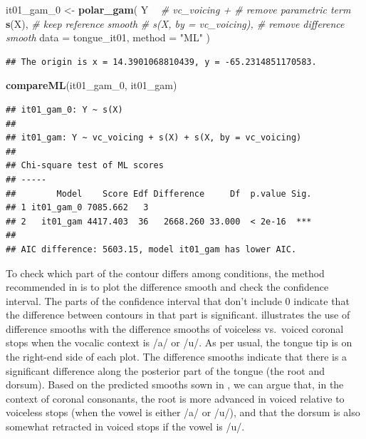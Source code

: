 \documentclass[11pt,]{article}
\newenvironment{Shaded}{\begin{snugshade}}{\end{snugshade}}
\newcommand{\CommentTok}[1]{\textcolor[rgb]{0.56,0.35,0.01}{\textit{#1}}}
\newcommand{\DataTypeTok}[1]{\textcolor[rgb]{0.13,0.29,0.53}{#1}}
\newcommand{\DecValTok}[1]{\textcolor[rgb]{0.00,0.00,0.81}{#1}}
\newcommand{\KeywordTok}[1]{\textcolor[rgb]{0.13,0.29,0.53}{\textbf{#1}}}
\newcommand{\NormalTok}[1]{#1}
\newcommand{\OperatorTok}[1]{\textcolor[rgb]{0.81,0.36,0.00}{\textbf{#1}}}
\newcommand{\StringTok}[1]{\textcolor[rgb]{0.31,0.60,0.02}{#1}}
\begin{document}
\begin{Shaded}
\begin{Highlighting}[]
\NormalTok{it01_gam_}\DecValTok{0}\NormalTok{ <-}\StringTok{ }\KeywordTok{polar_gam}\NormalTok{(}
\NormalTok{  Y }\OperatorTok{~}
\StringTok{    }\CommentTok{# vc_voicing +            # remove parametric term}
\StringTok{    }\KeywordTok{s}\NormalTok{(X),                     }\CommentTok{# keep reference smooth}
    \CommentTok{# s(X, by = vc_voicing),  # remove difference smooth}
  \DataTypeTok{data =}\NormalTok{ tongue_it01,}
  \DataTypeTok{method =} \StringTok{"ML"}
\NormalTok{)}
\end{Highlighting}
\end{Shaded}

\begin{verbatim}
## The origin is x = 14.3901068810439, y = -65.2314851170583.
\end{verbatim}

\begin{Shaded}
\begin{Highlighting}[]
\KeywordTok{compareML}\NormalTok{(it01_gam_}\DecValTok{0}\NormalTok{, it01_gam)}
\end{Highlighting}
\end{Shaded}

\begin{verbatim}
## it01_gam_0: Y ~ s(X)
## 
## it01_gam: Y ~ vc_voicing + s(X) + s(X, by = vc_voicing)
## 
## Chi-square test of ML scores
## -----
##        Model    Score Edf Difference     Df  p.value Sig.
## 1 it01_gam_0 7085.662   3                                
## 2   it01_gam 4417.403  36   2668.260 33.000  < 2e-16  ***
## 
## AIC difference: 5603.15, model it01_gam has lower AIC.
\end{verbatim}

To check which part of the contour differs among conditions, the method
recommended in \citet{soskuthy2017} is to plot the difference smooth and
check the confidence interval. The parts of the confidence interval that
don't include 0 indicate that the difference between contours in that
part is significant.  illustrates the use of difference
smooths with the difference smooths of voiceless vs.~voiced coronal
stops when the vocalic context is /a/ or /u/. As per usual, the tongue
tip is on the right-end side of each plot. The difference smooths
indicate that there is a significant difference along the posterior part
of the tongue (the root and dorsum). Based on the predicted smooths sown
in , we can argue that, in the context of coronal
consonants, the root is more advanced in voiced relative to voiceless
stops (when the vowel is either /a/ or /u/), and that the dorsum is also
somewhat retracted in voiced stops if the vowel is /u/.
\end{document}
